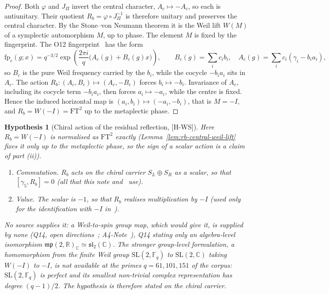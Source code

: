 \documentclass[11pt]{article}
\newtheorem{hypothesis}{Hypothesis}
\begin{document}
    \begin{proof}
      Both $\varphi$ and $J_\Pi$ invert the central character, $A_c\mapsto-A_c$, so each is antiunitary.
      Their quotient $R_b=\varphi\circ J_\Pi^{-1}$ is therefore unitary and preserves the central
      character.
      By the Stone--von Neumann theorem it is the Weil lift $W(M)$ of a symplectic automorphism $M$, up
      to phase.
      The element $M$ is fixed by the fingerprint.
      The O12 fingerprint~\cite{Beau2026a16} has the form
      \[
        \mathrm{fp}_c(g;x)=q^{-3/2}\exp\!\left(\frac{2\pi i}{q}\bigl(A_c(g)+B_c(g)x\bigr)\right),
        \qquad
        B_c(g)=\sum_i c_i b_i,
        \quad
        A_c(g)=\sum_i c_i(\gamma_i-b_i a_i),
      \]
      so $B_c$ is the pure Weil frequency carried by the $b_i$, while the cocycle $-b_i a_i$ sits in
      $A_c$.
      The action $R_b:(A_c,B_c)\mapsto(A_c,-B_c)$ forces $b_i\mapsto-b_i$.
      Invariance of $A_c$, including its cocycle term $-b_i a_i$, then forces $a_i\mapsto-a_i$, while the
      centre is fixed.
      Hence the induced horizontal map is $(a_i,b_i)\mapsto(-a_i,-b_i)$, that is $M=-I$, and
      $R_b=W(-I)=\mathrm{FT}^2$ up to the metaplectic phase.
    \end{proof}

    \begin{hypothesis}[Chiral action of the residual reflection, {[H-WS]}]
      \label{hyp:ws}
      Here $R_b=W(-I)$ is normalised as $\mathrm{FT}^2$ exactly (Lemma~\ref{lem:rb-central-weil-lift} fixes it only up
      to the metaplectic phase, so the sign of a scalar action is a claim of part (ii)).
      \begin{enumerate}
        \item[(i)] \emph{Commutation.} $R_b$ acts on the chiral carrier $S_L\oplus S_R$ as a scalar, so that
        $[\gamma_5,R_b]=0$ (all that this note and~\cite{Beau2026cho} use).
        \item[(ii)] \emph{Value.} The scalar is $-1$, so that $R_b$ realises multiplication by $-I$ (used only for the
        identification with $-I$ in~\cite{Beau2026aog}).
      \end{enumerate}
      No source supplies it: a Weil-to-spin group map, which would give it, is supplied by none (Q14,
      open directions~\cite{Beau2026q14}; A4-Note~\cite{Beau2026bim}), Q14 stating only an algebra-level
      isomorphism $\mathfrak{mp}(2,\mathbb{R})_{\mathbb{C}}\simeq\mathfrak{sl}_2(\mathbb{C})$.
      The stronger group-level formulation, a homomorphism from the finite Weil group $\mathrm{SL}(2,\mathbb{F}_q)$ to
      $\mathrm{SL}(2,\mathbb{C})$ taking $W(-I)$ to $-I$, is not available at the primes $q=61,101,151$ of the corpus:
      $\mathrm{SL}(2,\mathbb{F}_q)$ is perfect and its smallest non-trivial complex representation has degree
      $(q-1)/2$.
      The hypothesis is therefore stated on the chiral carrier.
    \end{hypothesis}
\end{document}

